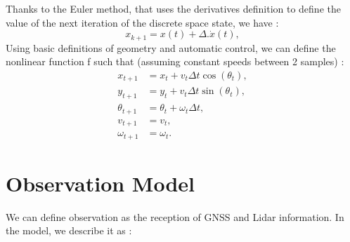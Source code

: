 \documentclass[conference]{IEEEtran}
\begin{document}
\vspace{2mm}

\noindent Thanks to the Euler method, that uses the derivatives definition to define the value of the next iteration of the discrete space state, we have : 
\[
x_{k+1} = x(t) + \Delta.\dot{x}(t),
\]
\noindent Using basic definitions of geometry and automatic control, we can define the nonlinear function f such that (assuming constant speeds between 2 samples) : 
\[
\begin{aligned}
x_{t+1} &= x_t + v_t \Delta t \cos(\theta_t), \\
y_{t+1} &= y_t + v_t \Delta t \sin(\theta_t), \\
\theta_{t+1} &= \theta_t + \omega_t \Delta t, \\
v_{t+1} &= v_t, \\
\omega_{t+1} &= \omega_t.
\end{aligned}
\]

\newpage

\section{Observation Model}

\noindent We can define observation as the reception of GNSS and Lidar information. In the model, we describe it as :
\end{document}
